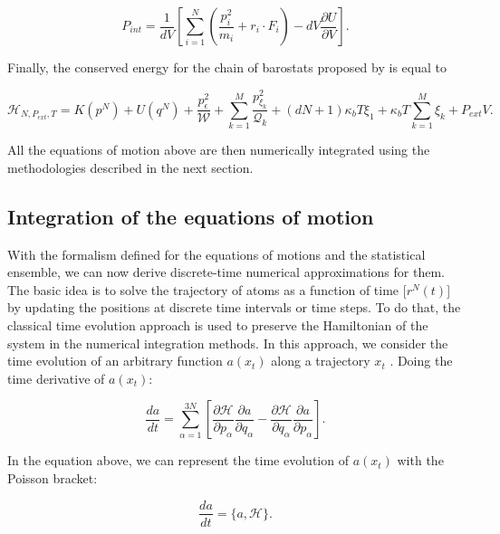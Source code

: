 \begin{equation}
P_{int} = \frac{1}{dV} \left[\sum_{i=1}^{N} \left(\frac{p_{i}^2}{m_i} + r_{i}\cdot F_i \right) - dV \frac{\partial U}{\partial V}\right].
\end{equation}


Finally, the conserved energy for the chain of barostats proposed by  is equal to

\begin{equation}
\mathcal{H}_{N,P_{ext},T} =  K(p^{N}) + U(q^{N})  + \frac{p_{\epsilon}^2}{\mathcal{W}}+\sum_{k=1}^{M }\frac{p^{2}_{\xi _{k}}}{\mathcal{Q} _{k}} + (dN+1)\kappa_{b}T \xi _{1}  + \kappa_{b}T\sum_{k=1}^{M}  \xi _{k} + P_{ext}V.
\end{equation}

All the equations of motion above are then numerically integrated  using the methodologies described in the next section.

\subsection{Integration of the equations of motion}

With the formalism defined for the equations of motions and the statistical ensemble, we can now derive discrete-time numerical approximations for them.  The basic idea is to solve the trajectory of atoms as a function of time [$r^{N}(t)$] by updating the positions at discrete time intervals or time steps. To do that, the classical time evolution approach is used to preserve the Hamiltonian of the system in the numerical integration methods. In this approach, we consider the time evolution of an arbitrary function $a(x_{t})$ along a trajectory $x_{t}$ \cite{tuckerman}. Doing the time derivative of $a(x_{t})$:

\begin{equation}
\frac{da}{dt} = \sum_{\alpha=1}^{3N} \left [  \dfrac{\partial \mathcal{H}}{\partial p_{\alpha}}\dfrac{\partial a}{\partial q_{\alpha}}  -  \dfrac{\partial \mathcal{H}}{\partial q_{\alpha}} \dfrac{\partial a}{\partial p_{\alpha}} \right].
\label{eqn:operador}
\end{equation}

In the equation above, we can represent the time evolution of $a(x_{t})$ with  the Poisson bracket:

\begin{equation}
\frac{da}{dt} = \{a,\mathcal{H}\}.
\end{equation}

